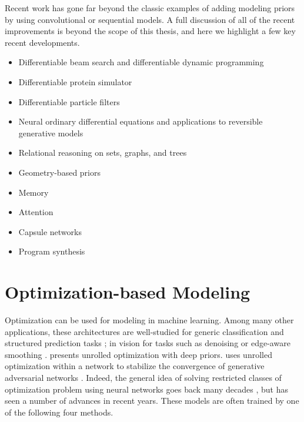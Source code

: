 Recent work has gone far beyond the classic examples of
adding modeling priors by using convolutional or
sequential models.
A full discussion of all of the
recent improvements is beyond the scope of this thesis,
and here we highlight a few key recent
developments.
\begin{itemize}
\item Differentiable beam search \citep{goyal2018continuous}
  and differentiable dynamic programming \citep{mensch2018differentiable}
\item Differentiable protein simulator \citep{ingraham2018learning}
\item Differentiable particle filters \citep{jonschkowski2018differentiable}
\item Neural ordinary differential equations \citep{chen2018neural}
  and applications to reversible generative models \citep{grathwohl2018ffjord}
\item Relational reasoning on sets, graphs, and trees
  \citep{battaglia2018relational,zaheer2017deep,
    kipf2016semi,gilmer2017neural,santoro2017simple,
    hamilton2017inductive,battaglia2016interaction,
    xu2018powerful,farquhar2017treeqn,shen2018ordered}
\item Geometry-based priors
  \citep{bronstein2017geometric,gulcehre2018hyperbolic,
     monti2017geometric,tang2018ba,li2018smoothing}
\item Memory \citep{sukhbaatar2015end,graves2014neural,graves2016hybrid,xiong2016dynamic,hill2015goldilocks,parisotto2017neural}
\item Attention \citep{bahdanau2014neural,vaswani2017attention,wang2018non}
\item Capsule networks \citep{sabour2017dynamic,hinton2018matrix,xinyi2018capsule}
\item Program synthesis
\citep{reed2015neural,neelakantan2015neural,balog2016deepcoder,devlin2017robustfill,parisotto2016neuro}
\end{itemize}

\section{Optimization-based Modeling}
\label{sec:bg:opt}
Optimization can be used for modeling in machine learning.
Among many other applications, these architectures are well-studied for
generic classification and structured prediction tasks
\citep{goodfellow2013multi,stoyanov2011empirical,brakel2013training,lecun2006tutorial,belanger2016structured,belanger2017end};
in vision for tasks such as denoising
\citep{tappen2007learning,schmidt2014shrinkage}
or edge-aware smoothing \citep{barron2016fast}.
\citet{diamond2017unrolled} presents unrolled optimization
with deep priors.
\citet{metz2016unrolled} uses unrolled optimization within a network to
stabilize the convergence of generative adversarial networks
\citep{goodfellow2014generative}.
Indeed, the general idea of solving restricted classes of
optimization problem using neural networks goes back
many decades \citep{kennedy1988neural, lillo1993solving},
but has seen a number of advances in recent years.
These models are often trained by one of
the following four methods.

